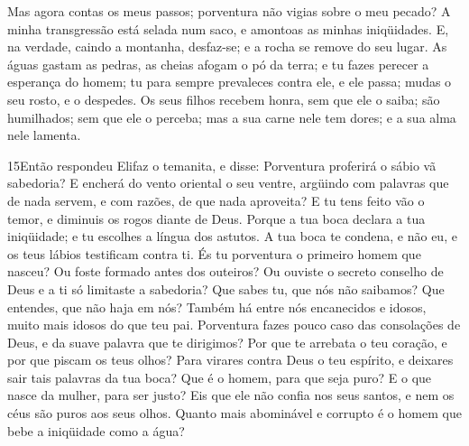 Mas agora contas os meus passos; porventura não vigias sobre o
meu pecado? A minha transgressão está selada num saco, e
amontoas as minhas iniqüidades. E, na verdade, caindo a
montanha, desfaz-se; e a rocha se remove do seu lugar. As
águas gastam as pedras, as cheias afogam o pó da terra; e tu fazes
perecer a esperança do homem; tu para sempre prevaleces
contra ele, e ele passa; mudas o seu rosto, e o despedes. Os
seus filhos recebem honra, sem que ele o saiba; são humilhados; sem
que ele o perceba; mas a sua carne nele tem dores; e a sua
alma nele lamenta.

\medskip

\lettrine{15} Então respondeu Elifaz o temanita, e disse:
Porventura proferirá o sábio vã sabedoria? E encherá do vento
oriental o seu ventre, argüindo com palavras que de nada servem,
e com razões, de que nada aproveita? E tu tens feito vão o
temor, e diminuis os rogos diante de Deus. Porque a tua boca
declara a tua iniqüidade; e tu escolhes a língua dos astutos. A
tua boca te condena, e não eu, e os teus lábios testificam contra
ti. És tu porventura o primeiro homem que nasceu? Ou foste
formado antes dos outeiros? Ou ouviste o secreto conselho de
Deus e a ti só limitaste a sabedoria? Que sabes tu, que nós não
saibamos? Que entendes, que não haja em nós? Também há entre
nós encanecidos e idosos, muito mais idosos do que teu pai.
Porventura fazes pouco caso das consolações de Deus, e da
suave palavra que te dirigimos? Por que te arrebata o teu
coração, e por que piscam os teus olhos? Para virares contra
Deus o teu espírito, e deixares sair tais palavras da tua boca?
Que é o homem, para que seja puro? E o que nasce da mulher,
para ser justo? Eis que ele não confia nos seus santos, e nem
os céus são puros aos seus olhos. Quanto mais abominável e
corrupto é o homem que bebe a iniqüidade como a água?

